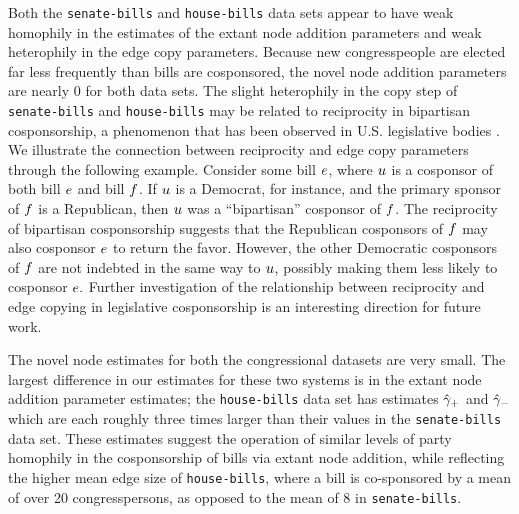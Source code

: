 \documentclass[aps,pre,reprint,superscriptaddress,nofootinbib]{revtex4-2}
\begin{document}
Both the \texttt{senate-bills} and \texttt{house-bills} data sets appear to have weak homophily in the estimates of the extant node addition parameters and weak heterophily in the edge copy parameters.
Because new congresspeople are elected far less frequently than bills are cosponsored, the novel node addition parameters are nearly 0 for both data sets. 
The slight heterophily in the copy step of \texttt{senate-bills} and \texttt{house-bills} may be related to reciprocity in bipartisan cosponsorship, a phenomenon that has been observed in U.S. legislative bodies \cite{harbridge2023bipartisan,dobson2026selective}.
We illustrate the connection between reciprocity and edge copy parameters through the following example.
Consider some bill $e$, where $u$ is a cosponsor of both bill $e$ and bill $f$.
If $u$ is a Democrat, for instance, and the primary sponsor of $f$ is a Republican, then $u$ was a ``bipartisan'' cosponsor of $f$.
The reciprocity of bipartisan cosponsorship suggests that the Republican cosponsors of $f$ may also cosponsor $e$ to return the favor.
However, the other Democratic cosponsors of $f$ are not indebted in the same way to $u$, possibly making them less likely to cosponsor $e.$
Further investigation of the relationship between reciprocity and edge copying in legislative cosponsorship is an interesting direction for future work.


The novel node estimates for both the congressional datasets are very small. 
The largest difference in our estimates for these two systems is in the extant node addition parameter estimates; the \texttt{house-bills} data set has estimates $\hat{\gamma}_+$ and $\hat{\gamma}_-$ which are each roughly three times larger than their values in the \texttt{senate-bills} data set.
These estimates suggest the operation of similar levels of party homophily in the cosponsorship of bills via extant node addition, while reflecting the higher mean edge size of \texttt{house-bills}, where a bill is co-sponsored by a mean of over 20 congresspersons, as opposed to the mean of 8 in \texttt{senate-bills}. 
\end{document}
